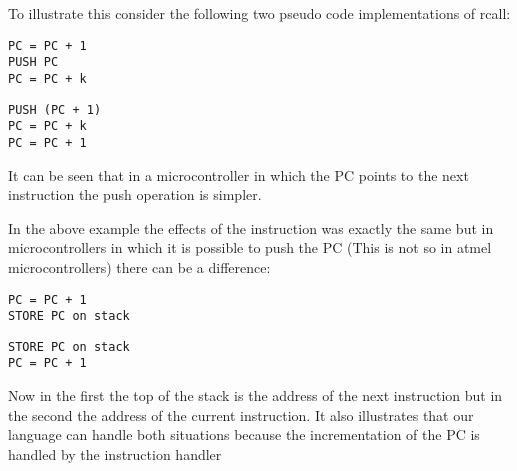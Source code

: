 To illustrate this consider the following two pseudo code
implementations of rcall:

\lstset{caption=PC points to next instruction}
\begin{lstlisting}
PC = PC + 1
PUSH PC
PC = PC + k
\end{lstlisting}

\lstset{caption=PC points to current instruction}
\begin{lstlisting}
PUSH (PC + 1)
PC = PC + k
PC = PC + 1
\end{lstlisting}

It can be seen that in a microcontroller in which the PC points to the
next instruction the push operation is simpler.

In the above example the effects of the instruction was exactly the same
but in microcontrollers in which it is possible to push the PC (This
is not so in atmel microcontrollers) there can be a difference:

\lstset{caption=PC points to next instruction}
\begin{lstlisting}
PC = PC + 1
STORE PC on stack
\end{lstlisting}

\lstset{caption=PC points to current instruction}
\begin{lstlisting}
STORE PC on stack
PC = PC + 1
\end{lstlisting}

Now in the first the top of the stack is the address of the next
instruction but in the second the address of the current instruction.
It also illustrates that our language can handle both situations
because the incrementation of the PC is handled by the instruction
handler
